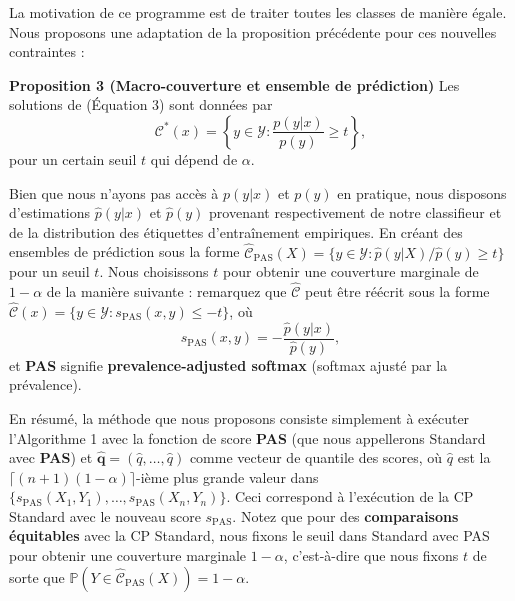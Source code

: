 \documentclass[12pt,a4paper]{article}
\begin{document}
\noindent La motivation de ce programme est de traiter toutes les classes de manière égale. Nous proposons une adaptation de la proposition précédente pour ces nouvelles contraintes :

\begin{tcolorbox}[
    enhanced,
    colback=propbg,
    colframe=propbg,
    boxrule=0pt,
    leftrule=4pt,
    borderline west={4pt}{0pt}{propborder},
    arc=2pt,
    left=2mm, right=2mm, top=2mm, bottom=2mm
]
\textbf{Proposition 3 (Macro-couverture et ensemble de prédiction)} Les solutions de ({\color{linkorange}Équation 3}) sont données par
\[
\mathcal{C}^*(x) = \left\{ y \in \mathcal{Y} : \frac{p(y|x)}{p(y)} \geq t \right\},
\]
pour un certain seuil $t$ qui dépend de $\alpha$.
\end{tcolorbox}


\noindent Bien que nous n'ayons pas accès à $p(y|x)$ et $p(y)$ en pratique, nous disposons d'estimations $\hat{p}(y|x)$ et $\hat{p}(y)$ provenant respectivement de notre classifieur et de la distribution des étiquettes d'entraînement empiriques. En créant des ensembles de prédiction sous la forme $\widehat{\mathcal{C}}_{\text{PAS}}(X) = \{ y \in \mathcal{Y} : \hat{p}(y|X)/\hat{p}(y) \geq t \}$ pour un seuil $t$. Nous choisissons $t$ pour obtenir une couverture marginale de $1 - \alpha$ de la manière suivante : remarquez que $\widehat{\mathcal{C}}$ peut être réécrit sous la forme $\widehat{\mathcal{C}}(x) = \{ y \in \mathcal{Y} : s_{\text{PAS}}(x, y) \leq -t \}$, où
\[
s_{\text{PAS}}(x, y) = -\frac{\hat{p}(y|x)}{\hat{p}(y)},
\]
et \textbf{PAS} signifie \textbf{prevalence-adjusted softmax} (softmax ajusté par la prévalence).

\noindent En résumé, la méthode que nous proposons consiste simplement à exécuter l'{\color{citeorange}Algorithme 1} avec la fonction de score \textbf{PAS} (que nous appellerons Standard avec \textbf{PAS}) et $\hat{\mathbf{q}} = (\hat{q}, \dots, \hat{q})$ comme vecteur de quantile des scores, où $\hat{q}$ est la $\lceil (n + 1)(1 - \alpha) \rceil$-ième plus grande valeur dans $\{s_{\text{PAS}}(X_1, Y_1), \dots, s_{\text{PAS}}(X_n, Y_n)\}$. Ceci correspond à l'exécution de la CP Standard avec le nouveau score $s_{\text{PAS}}$. Notez que pour des \textbf{comparaisons équitables} avec la CP Standard, nous fixons le seuil dans Standard avec PAS pour obtenir une couverture marginale $1 - \alpha$, c'est-à-dire que nous fixons $t$ de sorte que $\mathbb{P}(Y \in \widehat{\mathcal{C}}_{\text{PAS}}(X)) = 1 - \alpha$. \\
\end{document}
